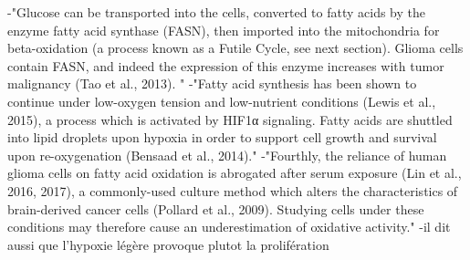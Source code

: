 \documentclass[11pt,a4paper]{article}
\begin{document}
-"Glucose can be transported into the cells, converted to fatty acids by the enzyme fatty acid synthase (FASN), then imported into the mitochondria for beta-oxidation (a process known as a Futile Cycle, see next section). Glioma cells contain FASN, and indeed the expression of this enzyme increases with tumor malignancy (Tao et al., 2013). "
-"Fatty acid synthesis has been shown to continue under low-oxygen tension and low-nutrient conditions (Lewis et al., 2015), a process which is activated by HIF1α signaling. Fatty acids are shuttled into lipid droplets upon hypoxia in order to support cell growth and survival upon re-oxygenation (Bensaad et al., 2014)."
-"Fourthly, the reliance of human glioma cells on fatty acid oxidation is abrogated after serum exposure (Lin et al., 2016, 2017), a commonly-used culture method which alters the characteristics of brain-derived cancer cells (Pollard et al., 2009). Studying cells under these conditions may therefore cause an underestimation of oxidative activity."
-il dit aussi que l'hypoxie légère provoque plutot la prolifération
\end{document}
